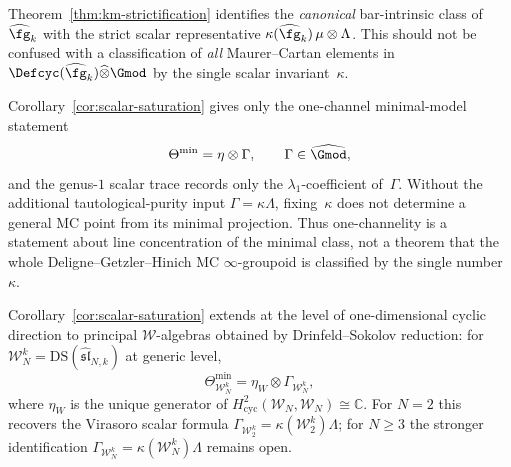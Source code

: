 \begin{remark}
\label{rem:one-channel-not-gauge-rigid}
Theorem~\ref{thm:km-strictification} identifies the
\emph{canonical} bar-intrinsic class of\/ $\widehat{\fg}_k$
with the strict scalar representative
$\kappa(\widehat{\fg}_k)\,\mu \otimes \Lambda$.
This should not be confused with a classification of
\emph{all} Maurer--Cartan elements in
$\Defcyc(\widehat{\fg}_k)\widehat{\otimes}\Gmod$
by the single scalar invariant~$\kappa$.

Corollary~\ref{cor:scalar-saturation} gives only the one-channel
minimal-model statement
\[
\Theta^{\min} = \eta \otimes \Gamma,
\qquad
\Gamma \in \widehat{\Gmod},
\]
and the genus-$1$ scalar trace records only the
$\lambda_1$-coefficient of\/~$\Gamma$.
Without the additional tautological-purity input
$\Gamma = \kappa\Lambda$, fixing~$\kappa$ does not determine a
general MC point from its minimal projection.
Thus one-channelity is a statement about line concentration of
the minimal class, not a theorem that the whole
Deligne--Getzler--Hinich MC $\infty$-groupoid is classified by
the single number~$\kappa$.
\end{remark}

\begin{proposition}
\label{prop:w-algebra-scalar-saturation}
Corollary~\textup{\ref{cor:scalar-saturation}} extends at the level
of one-dimensional cyclic direction to principal
$\mathcal{W}$-algebras obtained by Drinfeld--Sokolov reduction:
for $\mathcal{W}_N^k = \mathrm{DS}(\widehat{\mathfrak{sl}}_{N,k})$
at generic level,
\[
\Theta_{\mathcal{W}_N^k}^{\min}
= \eta_W \otimes \Gamma_{\mathcal{W}_N^k},
\]
where $\eta_W$ is the unique generator of
$H^2_{\mathrm{cyc}}(\mathcal{W}_N, \mathcal{W}_N) \cong \mathbb{C}$.
For $N=2$ this recovers the Virasoro scalar formula
$\Gamma_{\mathcal{W}_2^k}=\kappa(\mathcal{W}_2^k)\Lambda$; for
$N\ge3$ the stronger identification
$\Gamma_{\mathcal{W}_N^k}=\kappa(\mathcal{W}_N^k)\Lambda$ remains
open.
\end{proposition}

